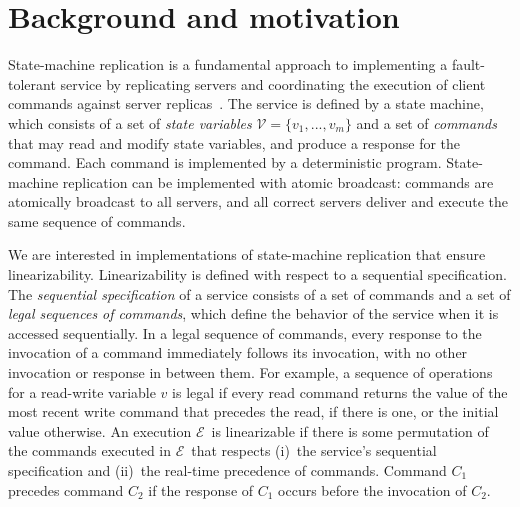 \documentclass[10pt, conference, compsocconf, letterpaper]{IEEEtranv17}
\newcommand{\ex}{$\mathcal{E}$}
\newcommand{\vvm}{\mathcal{V}}
\begin{document}

\section{Background and motivation}
\label{sec:smr}

State-machine replication is a fundamental approach to implementing a fault-tolerant service by replicating servers and coordinating the execution of client commands against server replicas~\cite{Lam78, Sch90}. 
The service is defined by a state machine, which consists of a set of \emph{state variables} $\vvm = \{v_1, ..., v_m\}$ 
and a set of \emph{commands} that may read and modify state variables, and produce a response for the command.
Each command is implemented by a deterministic program.
State-machine replication can be implemented with atomic broadcast: commands are atomically broadcast to all servers, and all correct servers deliver and execute the same sequence of commands.

We are interested in implementations of state-machine replication that ensure linearizability.
%
Linearizability is defined with respect to a sequential specification.
The \emph{sequential specification} of a service consists of a set of commands and a set of \emph{legal sequences of commands}, which define the behavior of the service when it is accessed sequentially.
In a legal sequence of commands, every response to the invocation of a command immediately follows its invocation, with no other invocation or response in between them.
For example, a sequence of operations for a read-write variable $v$ is legal if every read command returns the value of the most recent write command that precedes the read, if there is one, or the initial value otherwise.
An execution \ex\ is linearizable if there is some permutation of the commands executed in \ex\ that respects (i)~the service's sequential specification and (ii)~the real-time precedence of commands.
Command $C_1$ precedes command $C_2$ if the response of $C_1$ occurs before the invocation of $C_2$.
\end{document}
